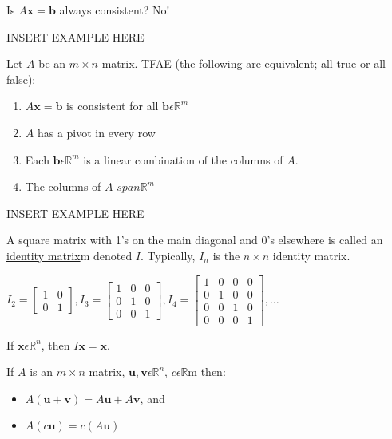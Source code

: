 \documentclass{report}
\begin{document}
Is $A\mathbf{x}=\mathbf{b}$ always consistent? No!
\begin{example}
	INSERT EXAMPLE HERE
\end{example}
\begin{theorem}
	Let $A$ be an $m\times n$ matrix. TFAE (the following are equivalent; all true or all false):
	\begin{enumerate}
		\item $A\mathbf{x}=\mathbf{b}$ is consistent for all $\mathbf{b}\epsilon \mathbb{R}^m$
		\item $A$ has a pivot in every row
		\item Each $\mathbf{b}\epsilon \mathbb{R}^m$ is a linear combination of the columns of $A$.
		\item The columns of $A$ $span\mathbb{R}^m$
	\end{enumerate}
\end{theorem}
\begin{example}
	INSERT EXAMPLE HERE
\end{example}
\begin{definition}
	A square matrix with 1's on the main diagonal and 0's elsewhere is called an \underline{identity matrix}m denoted $I$. Typically, $I_n$ is the $n\times n$ identity matrix.
	\begin{center}
		$I_2 = \begin{bmatrix}
			1 & 0 \\
			0 & 1
		\end{bmatrix},
		I_3 = \begin{bmatrix}
			1 & 0 & 0 \\
			0 & 1 & 0 \\
			0 & 0 & 1
		\end{bmatrix},
		I_4 = \begin{bmatrix}
			1 & 0 & 0 & 0 \\
			0 & 1 & 0 & 0 \\
			0 & 0 & 1 & 0 \\
			0 & 0 & 0 & 1 
		\end{bmatrix},
		\ldots$
	\end{center}
\end{definition}
\begin{proposition}
	If $\mathbf{x}\epsilon \mathbb{R}^n$, then $I\mathbf{x} = \mathbf{x}$.
\end{proposition}
\begin{theorem}
	If $A$ is an $m\times n$ matrix, $\mathbf{u}, \mathbf{v}\epsilon \mathbb{R}^n$, $c\epsilon \mathbb{R}$m then:
	\begin{itemize}
		\item $A(\mathbf{u}+\mathbf{v}) = A\mathbf{u}+A\mathbf{v}$, and
		\item $A(c\mathbf{u}) = c(A\mathbf{u})$
	\end{itemize}
\end{theorem}
\end{document}
